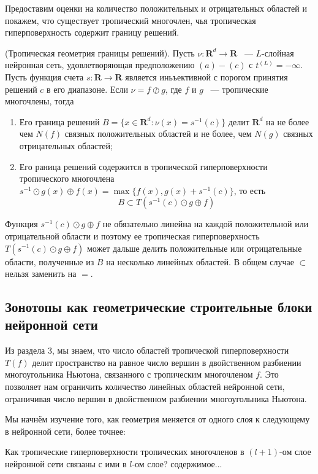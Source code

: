 \documentclass[russian]{lecture-notes}
\begin{document}
	Предоставим оценки на количество положительных и отрицательных областей и покажем, что существует тропический многочлен, чья тропическая гиперповерхность содержит границу решений.
	\begin{Proposition}
		(Тропическая геометрия границы решений). Пусть $\nu : \mathbf{R}^d \rightarrow \mathbf{R}$  ~--- $L$-слойная нейронная сеть, удовлетворяющая предположению $(a)-(c)$ с $t^{(L)} = -\infty$. Пусть функция счета $s : \mathbf{R} \rightarrow \mathbf{R}$  является иньъективной с порогом принятия решений $c$ в его диапазоне. Если $\nu = f \oslash g$, где $f$ и $g$ ~--- тропические многочлены, тогда 
		\begin{enumerate}
			\item Его граница решений $B = \{x \in \mathbf{R}^d:\nu(x) = s^{-1}(c)\}$ делит $\mathbf{R}^d$ на не более чем $N(f)$ связных положительных областей и не более, чем $N(g)$ связных отрицательных областей;
			\item Его раница решений содержится в тропической гиперповерхности тропического многочлена $s^{-1}\odot g(x)\oplus f(x) = \max\{f(x),g(x)+s^{-1}(c)\}$, то есть 
				\[B 
				\subset T(s^{-1}(c)\odot g \oplus f)
				\]  
		\end{enumerate}
	
		Функция $s^{-1}(c) \odot g \oplus f$ не обязательно линейна на каждой положительной или отрицательной области и поэтому ее тропическая гиперповерхность $T(s^{-1}(c)\odot g \oplus f)$ может дальше делить положительные или отрицательные области, полученные из $B$ на несколько линейных областей. В общем случае $\subset$ нельзя заменить на $=$.
	\end{Proposition}

	\subsection{Зонотопы как геометрические строительные блоки нейронной сети}
	
	Из раздела 3, мы знаем, что число областей тропической гиперповерхности $T(f)$ делит пространство на равное число вершин в двойственном разбиении многоугольника Ньютона, связанного с тропическим многочленом $f$. Это позволяет нам ограничить количество линейных областей нейронной сети, ограничивая число вершин в двойственном разбиении многоугольника Ньютона. 
	
	Мы начнём изучение того, как геометрия меняется от одного слоя к следующему в нейронной сети, более точнее:
	
	\begin{Question}
		Как тропические гиперповерхности тропических многочленов в $(l + 1)$-ом слое нейронной сети связаны с ими в $l$-ом слое?
		содержимое...
	\end{Question}
	
\end{document}

